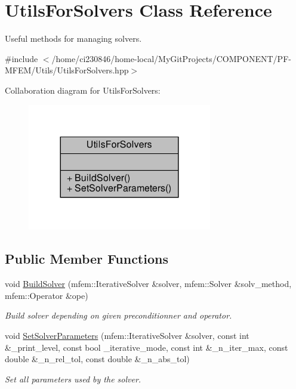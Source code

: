 \hypertarget{classUtilsForSolvers}{}\section{Utils\+For\+Solvers Class Reference}
\label{classUtilsForSolvers}


Useful methods for managing solvers.  




{\ttfamily \#include $<$/home/ci230846/home-\/local/\+My\+Git\+Projects/\+C\+O\+M\+P\+O\+N\+E\+N\+T/\+P\+F-\/\+M\+F\+E\+M/\+Utils/\+Utils\+For\+Solvers.\+hpp$>$}



Collaboration diagram for Utils\+For\+Solvers\+:\nopagebreak
\begin{figure}[H]
\begin{center}
\leavevmode
\includegraphics[width=228pt]{classUtilsForSolvers__coll__graph}
\end{center}
\end{figure}
\subsection*{Public Member Functions}
\begin{DoxyCompactItemize}
\item 
void \hyperlink{classUtilsForSolvers_a5c76f7ef4f28a5e22f6d07666134aa4d}{Build\+Solver} (mfem\+::\+Iterative\+Solver \&solver, mfem\+::\+Solver \&solv\+\_\+method, mfem\+::\+Operator \&ope)
\begin{DoxyCompactList}\small\item\em Build solver depending on given preconditionner and operator. \end{DoxyCompactList}\item 
void \hyperlink{classUtilsForSolvers_a5e352c96817ea210dcf3e080c13d4b1d}{Set\+Solver\+Parameters} (mfem\+::\+Iterative\+Solver \&solver, const int \&\+\_\+print\+\_\+level, const bool \+\_\+iterative\+\_\+mode, const int \&\+\_\+n\+\_\+iter\+\_\+max, const double \&\+\_\+n\+\_\+rel\+\_\+tol, const double \&\+\_\+n\+\_\+abs\+\_\+tol)
\begin{DoxyCompactList}\small\item\em Set all parameters used by the solver. \end{DoxyCompactList}\end{DoxyCompactItemize}


